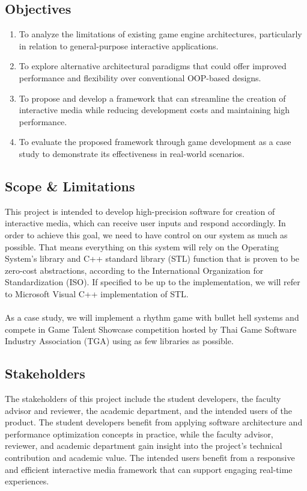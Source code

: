 \subsection{Objectives}
\label{subsec:objectives}

\begin{enumerate}
    \item To analyze the limitations of existing game engine architectures, particularly in relation to general-purpose interactive applications.
    \item To explore alternative architectural paradigms that could offer improved performance and flexibility over conventional OOP-based designs.
    \item To propose and develop a framework that can streamline the creation of interactive media while reducing development costs and maintaining high performance.
    \item To evaluate the proposed framework through game development as a case study to demonstrate its effectiveness in real-world scenarios.
\end{enumerate}

\subsection{Scope \& Limitations}
\label{subsec:scope-and-limitation}
This project is intended to develop high-precision software for creation of interactive media, which can receive user inputs and respond accordingly.
In order to achieve this goal, we need to have control on our system as much as possible.
That means everything on this system will rely on the Operating System's library and
C++ standard library (STL) function that is proven to be zero-cost abstractions, according to the
International Organization for Standardization (ISO). If specified to be up to the implementation,
we will refer to Microsoft Visual C++ implementation of STL\@.
\\\\
As a case study, we will implement a rhythm game with bullet hell systems and
compete in Game Talent Showcase competition hosted by Thai Game Software Industry Association (TGA)
using as few libraries as possible.

\subsection{Stakeholders}
\label{subsec:stakeholders}

The stakeholders of this project include the student developers, the faculty advisor and reviewer, the academic department,
and the intended users of the product.
The student developers benefit from applying software architecture and performance optimization concepts in practice, while
the faculty advisor, reviewer, and academic department gain insight into the project's technical contribution and academic value.
The intended users benefit from a responsive and efficient interactive media framework that can support engaging real-time experiences.

